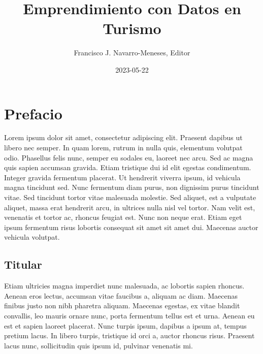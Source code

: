 \documentclass[
  letterpaper,
  DIV=11,
  numbers=noendperiod]{scrreprt}
\title{Emprendimiento con Datos en Turismo}
\author{Francisco J. Navarro-Meneses, Editor}
\date{2023-05-22}
\renewcommand*\contentsname{Table of contents}
\newcommand\contentsname{Table of contents}
\begin{document}
\maketitle
\ifdefined\Shaded\renewenvironment{Shaded}{\begin{tcolorbox}[borderline west={3pt}{0pt}{shadecolor}, boxrule=0pt, interior hidden, enhanced, breakable, frame hidden, sharp corners]}{\end{tcolorbox}}\fi

\renewcommand*\contentsname{Table of contents}
{
\hypersetup{linkcolor=}
\setcounter{tocdepth}{2}
\tableofcontents
}

\hypertarget{prefacio}{%
\chapter*{Prefacio}\label{prefacio}}


Lorem ipsum dolor sit amet, consectetur adipiscing elit. Praesent
dapibus ut libero nec semper. In quam lorem, rutrum in nulla quis,
elementum volutpat odio. Phasellus felis nunc, semper eu sodales eu,
laoreet nec arcu. Sed ac magna quis sapien accumsan gravida. Etiam
tristique dui id elit egestas condimentum. Integer gravida fermentum
placerat. Ut hendrerit viverra ipsum, id vehicula magna tincidunt sed.
Nunc fermentum diam purus, non dignissim purus tincidunt vitae. Sed
tincidunt tortor vitae malesuada molestie. Sed aliquet, est a vulputate
aliquet, massa erat hendrerit arcu, in ultrices nulla nisl vel tortor.
Nam velit est, venenatis et tortor ac, rhoncus feugiat est. Nunc non
neque erat. Etiam eget ipsum fermentum risus lobortis consequat sit amet
sit amet dui. Maecenas auctor vehicula volutpat.

\hypertarget{titular}{%
\section*{Titular}\label{titular}}


Etiam ultricies magna imperdiet nunc malesuada, ac lobortis sapien
rhoncus. Aenean eros lectus, accumsan vitae faucibus a, aliquam ac diam.
Maecenas finibus justo non nibh pharetra aliquam. Maecenas egestas, ex
vitae blandit convallis, leo mauris ornare nunc, porta fermentum tellus
est et urna. Aenean eu est et sapien laoreet placerat. Nunc turpis
ipsum, dapibus a ipsum at, tempus pretium lacus. In libero turpis,
tristique id orci a, auctor rhoncus risus. Praesent lacus nunc,
sollicitudin quis ipsum id, pulvinar venenatis mi.
\end{document}
